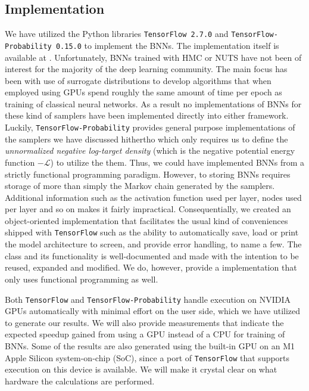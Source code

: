 \subsection{Implementation}
We have utilized the Python libraries {\tt TensorFlow 2.7.0} and {\tt TensorFlow-Probability 0.15.0} \cite{tf, tfp} to implement the BNNs. 
The implementation itself is available at \cite{rene_alexander_ask_2022_6800167}. Unfortunately, BNNs trained with HMC or NUTS have not been of interest for the majority of the deep learning community. The main focus has been with use of surrogate distributions to develop algorithms that when employed using GPUs spend roughly the same amount of time per epoch as training of classical neural networks. As a result no implementations of BNNs for these kind of samplers have been implemented directly into either framework. Luckily, {\tt TensorFlow-Probability} provides general purpose implementations of the samplers we have discussed hithertho 
which only requires us to define the \textit{unnormalized negative log-target density} (which is the negative potential energy function $-\mathcal{L}$) to utilize the them. Thus, we could have implemented BNNs from a strictly functional programming paradigm. However, to storing BNNs requires storage of more than simply the Markov chain generated by the samplers. Additional information such as the activation function used per layer, nodes used per layer and so on makes it fairly impractical. Consequentially, we created an object-oriented implementation that facilitates the usual kind of conveniences shipped with {\tt TensorFlow} such as the ability to automatically save, load or print the model architecture to screen, and provide error handling, to name a few. The class and its functionality is well-documented and made with the intention to be reused, expanded and modified. We do, however, provide a implementation that only uses functional programming as well.

Both {\tt TensorFlow} and {\tt TensorFlow-Probability} handle execution on NVIDIA GPUs automatically with minimal effort on the user side, which we have utilized to generate our results. We will also provide measurements that indicate the expected speedup gained from using a GPU instead of a CPU for training of BNNs. Some of the results are also generated using the built-in GPU on an M1 Apple Silicon system-on-chip (SoC), since a port of {\tt TensorFlow} that supports execution on this device is available. We will make it crystal clear on what hardware the calculations are performed.


